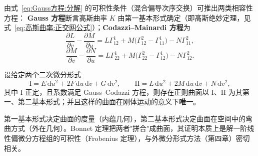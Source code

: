 \begin{theorem}
	由式~\eqref{eq:Gauss方程:分解} 的可积性条件（混合偏导次序交换）可推出两类相容性方程：
	\textbf{Gauss 方程}断言高斯曲率 $K$ 由第一基本形式确定（即高斯绝妙定理，见式~\eqref{eq:高斯曲率:正交网公式}）；\textbf{Codazzi--Mainardi 方程}为
	\begin{equation}
		\frac{\partial L}{\partial v}-\frac{\partial M}{\partial u}
		=L\Gamma_{12}^{1}+M\bigl(\Gamma_{12}^{2}-\Gamma_{11}^{1}\bigr)-N\Gamma_{11}^{2},
		\label{eq:Codazzi:方程1}
	\end{equation}
	\begin{equation}
		\frac{\partial M}{\partial v}-\frac{\partial N}{\partial u}
		=L\Gamma_{22}^{1}+M\bigl(\Gamma_{22}^{2}-\Gamma_{12}^{1}\bigr)-N\Gamma_{12}^{2}.
		\label{eq:Codazzi:方程2}
	\end{equation}
\end{theorem}

\begin{theorem}
	设给定两个二次微分形式
	\begin{equation}
		\mathrm{I}=E\,\mathrm{d}u^{2}+2F\,\mathrm{d}u\,\mathrm{d}v+G\,\mathrm{d}v^{2},
		\qquad
		\mathrm{II}=L\,\mathrm{d}u^{2}+2M\,\mathrm{d}u\,\mathrm{d}v+N\,\mathrm{d}v^{2},
		\label{eq:Bonnet:基本形式}
	\end{equation}
	其中 $\mathrm{I}$ 正定，且系数满足 Gauss--Codazzi 方程，则存在正则曲面以 $\mathrm{I}$、$\mathrm{II}$ 为其第一、第二基本形式；并且这样的曲面在刚体运动的意义下\textbf{唯一}。
	\label{thm:Bonnet定理}
\end{theorem}

\begin{remark}
	第一基本形式决定曲面的度量（内蕴几何），第二基本形式决定曲面在空间中的弯曲方式（外在几何）。Bonnet 定理把两者"拼合"成曲面，其证明本质上是解一阶线性偏微分方程组的可积性（Frobenius 定理），与外微分形式方法（第四章）密切相关。
\end{remark}
